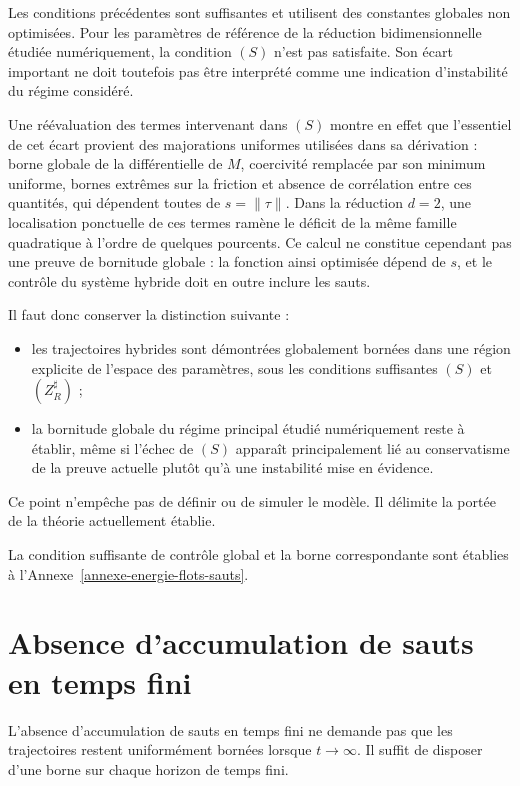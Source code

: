 Les conditions précédentes sont suffisantes et utilisent des constantes globales non optimisées. Pour les paramètres de référence de la réduction bidimensionnelle étudiée numériquement, la condition \((S)\) n'est pas satisfaite. Son écart important ne doit toutefois pas être interprété comme une indication d'instabilité du régime considéré.

Une réévaluation des termes intervenant dans \((S)\) montre en effet que l'essentiel de cet écart provient des majorations uniformes utilisées dans sa dérivation : borne globale de la différentielle de \(M\), coercivité remplacée par son minimum uniforme, bornes extrêmes sur la friction et absence de corrélation entre ces quantités, qui dépendent toutes de \(s=\|\tau\|\). Dans la réduction \(d=2\), une localisation ponctuelle de ces termes ramène le déficit de la même famille quadratique à l'ordre de quelques pourcents. Ce calcul ne constitue cependant pas une preuve de bornitude globale : la fonction ainsi optimisée dépend de \(s\), et le contrôle du système hybride doit en outre inclure les sauts.

Il faut donc conserver la distinction suivante :
\begin{itemize}
\tightlist
\item
les trajectoires hybrides sont démontrées globalement bornées dans une région explicite de l'espace des paramètres, sous les conditions suffisantes \((S)\) et \((Z_R^\sharp)\) ;
\item
la bornitude globale du régime principal étudié numériquement reste à établir, même si l'échec de \((S)\) apparaît principalement lié au conservatisme de la preuve actuelle plutôt qu'à une instabilité mise en évidence.
\end{itemize}

Ce point n'empêche pas de définir ou de simuler le modèle. Il délimite la portée de la théorie actuellement établie.

La condition suffisante de contrôle global et la borne correspondante sont établies à l'Annexe~\ref{annexe-energie-flots-sauts}.

\chapter{Absence d'accumulation de sauts en temps fini}
\label{t1-absence-daccumulation-de-sauts-en-temps-fini}

L'absence d'accumulation de sauts en temps fini ne demande pas que les trajectoires restent uniformément bornées lorsque \(t\to\infty\). Il suffit de disposer d'une borne sur chaque horizon de temps fini.


